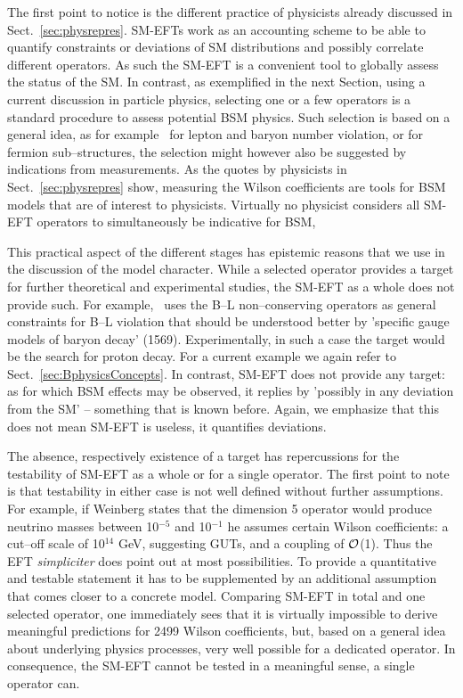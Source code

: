 The first point to notice is the different practice of physicists already discussed in
Sect.~\ref{sec:physrepres}.
SM-EFTs work as an accounting scheme to be able to quantify constraints or deviations
of SM distributions and possibly correlate different operators.
As such the SM-EFT is a convenient tool to globally assess the status of the SM.
In contrast, as exemplified in the next Section, using a current discussion in particle physics,
selecting one or a few operators is a standard procedure to assess potential BSM physics.
Such selection is based on a general idea, as for example~\cite{Weinberg:1979sa} for lepton
and baryon number violation, or \cite{Eichten:1983hw} for fermion sub--structures, the
selection might however also be suggested by indications from measurements. 
As the quotes by physicists in Sect.~\ref{sec:physrepres} show, measuring the Wilson coefficients
are tools for BSM models that are of interest to physicists.
Virtually no physicist considers all SM-EFT operators to simultaneously be indicative for BSM, 

This practical aspect of the different stages has epistemic reasons that we use in the discussion of
the model character.
While a selected operator provides a target for further theoretical and experimental studies,
the SM-EFT as a whole does not provide such.
For example,~\cite{Weinberg:1979sa} uses the B--L non--conserving operators as general
constraints for B--L violation that should be understood better by 'specific gauge models of
baryon decay' (1569).
Experimentally, in such a case the target would be the search for proton decay.
For a current example we again refer to Sect.~\ref{sec:BphysicsConcepts}.
In contrast, SM-EFT does not provide any target:
as for which BSM effects may be observed, it replies by 'possibly in any deviation from the SM'
-- something that is known before.
Again, we emphasize that this does not mean SM-EFT is useless, it quantifies deviations.

The absence, respectively existence of a target has repercussions for the testability of
SM-EFT as a whole or for a single operator.
The first point to note is that testability in either case is not well defined without
further assumptions.
For example, if Weinberg states that the dimension 5 operator would produce neutrino masses
between 10$^{-5}$ and 10$^{-1}$ he assumes certain Wilson coefficients: a cut--off scale of 
10$^{14}$ GeV, suggesting GUTs, and a coupling of $\cal{O}$(1).
Thus the EFT \textit{simpliciter} does point out at most possibilities. 
To provide a quantitative
and testable statement it has to be supplemented by an additional assumption that comes
closer to a concrete model.
Comparing SM-EFT in total and one selected operator, one immediately sees that it is
virtually impossible to derive meaningful predictions for 2499 Wilson coefficients, but,
based on a general idea about underlying physics processes, very well possible for 
a dedicated operator.
In consequence, the SM-EFT cannot be tested in a meaningful sense, a single operator can. 
  
